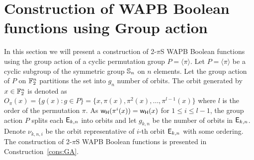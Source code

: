 \documentclass{llncs}
\begin{document}
\section{Construction of WAPB Boolean functions using Group action}\label{sec:GA}
In this section we will present a construction of 2-$\pi$S WAPB Boolean functions using the group action of a cyclic permutation group $P = \langle \pi \rangle$. Let $P = \langle \pi \rangle$ be a cyclic subgroup of the symmetric group $\mathbb{S}_n$ on $n$ elements. Let the group action of $P$ on $\mathbb{F}_2^n$ partitions the set into $g_n$ number of orbits. The orbit generated by $x \in \mathbb{F}_2^n$ is denoted as $O_\pi(x) = \{g(x) : g \in P\} = \{x , \pi(x), \pi^2 (x),\ldots ,\pi^{l-1}(x)\}$ where $l$ is the order of the permutation $\pi$. As $\mathsf{w_H}(\pi^{i}(x)) = \mathsf{w_H}(x)$ for $1 \leq i \leq {l-1}$, the group action $P$ splits each $\mathsf{E}_{k,n}$ into orbits and let $g_{k,n}$ be the number of orbits in $\mathsf{E}_{k,n}$.
Denote $\nu_{k,n,i}$ be the orbit representative of $i$-th orbit $\mathsf{E}_{k,n}$ with some ordering.
The construction of 2-$\pi$S WAPB Boolean functions is presented in Construction~\ref{cons:GA}.
\end{document}
